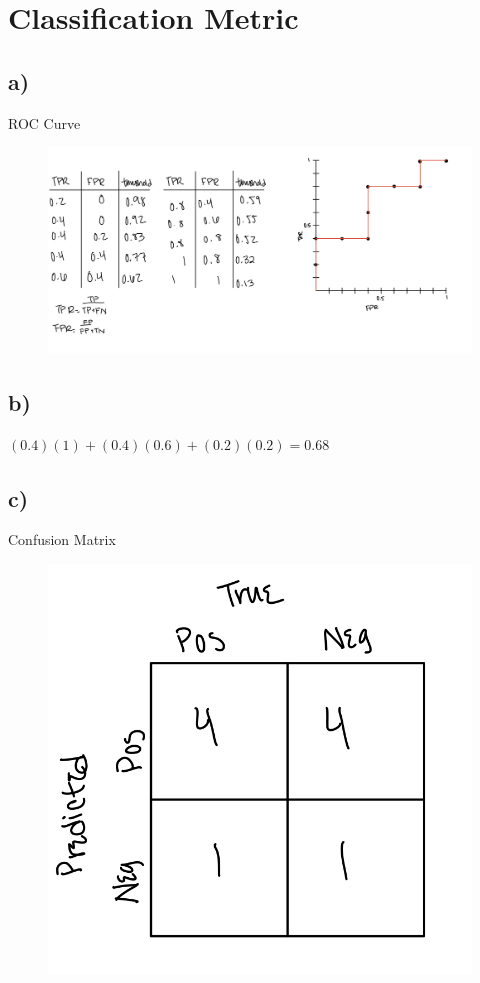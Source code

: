 \documentclass[12pt, letterpaper]{article}
\begin{document}
\newpage
\section{Classification Metric}
\subsection*{a)}ROC Curve
\FloatBarrier
\begin{figure}[h!]
  \includegraphics[scale=0.33]{./images/3a.jpg}
\end{figure}
\clearpage

\subsection*{b)} $(0.4)(1) + (0.4)(0.6) + (0.2)(0.2) = 0.68$

\subsection*{c)} Confusion Matrix
\FloatBarrier
\begin{figure}[h!]
  \includegraphics[scale=0.33]{./images/3c.jpg}
\end{figure}
\end{document}
